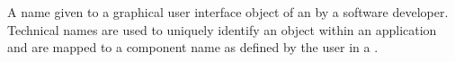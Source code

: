 \item[Technical Name]{
A name given to a graphical user interface object of an \gdaut{} by a software developer. Technical names are used to uniquely identify an object within an application and are 
mapped to a component name as defined by the user in a \gdstep{}.
}

